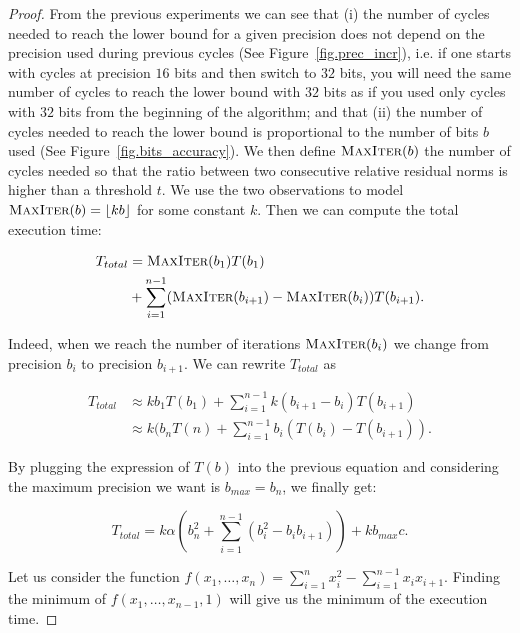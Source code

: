 \begin{proof}

    From the previous experiments we can see that (i) the number of cycles
    needed to reach the lower bound for a given precision does not depend on
    the precision used during previous cycles (See Figure~\ref{fig.prec_incr}),
    i.e.  if one starts with cycles at precision $16$ bits and then switch to
    $32$ bits, you will need the same number of cycles to reach the lower bound
    with $32$ bits as if you used only cycles with $32$ bits from the beginning
    of the algorithm; and that (ii) the number of cycles needed to reach the
    lower bound is proportional to the number of bits $b$ used (See
    Figure~\ref{fig.bits_accuracy}). We then define $\textsc{MaxIter}(b)$ the
    number of cycles needed so that the ratio between two consecutive relative
    residual norms is higher than a threshold $t$. We use the two observations
    to model $\textsc{MaxIter}(b) = \lfloor kb \rfloor$ for some constant $k$.
    Then we can compute the total execution time:

    \begin{align*}
        T_{total}& = \textsc{MaxIter}(b_1)T(b_1)\\ & +  \sum\limits_{i=1}^{n-1}
        (\textsc{MaxIter}(b_{i+1})-\textsc{MaxIter}(b_i))T(b_{i+1}).
    \end{align*}

    Indeed, when we reach the number of iterations $\textsc{MaxIter}(b_i)$ we
    change from precision $b_i$ to precision $b_{i+1}$.  We can rewrite
    $T_{total}$ as

    \begin{align*}
        T_{total} &\approx k b_{1} T(b_1) + \sum\limits_{i=1}^{n-1}
        k(b_{i+1}-b_{i})T(b_{i+1})\\ & \approx k ( b_{n}T(n) +
        \sum\limits_{i=1}^{n-1} b_i ( T(b_i) - T(b_{i+1})).
    \end{align*}

    By plugging the expression of $T(b)$ into the previous equation and considering
    the maximum precision we want is $b_{max}=b_n$, we finally get:

    \begin{equation}
        T_{total}  = k\alpha\left(b_n^2 + \sum\limits_{i=1}^{n-1} (b_i^2 - b_i b_{i+1})\right) + kb_{max}c.
    \end{equation}

    Let us consider the function $f(x_1,\dots,x_n) = \sum\limits_{i=1}^n x_i^2
    - \sum\limits_{i=1}^{n-1} x_ix_{i+1}$. Finding the minimum of
    $f(x_1,\dots,x_{n-1},1)$ will give us the minimum of the execution time.


\end{proof}

